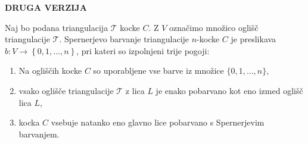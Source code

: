 \documentclass[mat1]{fmfdelo}
\newcommand{\0}{0}
\newcommand{\pT}{\mathcal T}
\begin{document}
\newpage
\textbf{DRUGA VERZIJA}
\begin{definicija}\label{def:alo}
Naj bo podana triangulacija $\pT$ kocke $C$. Z $V$ označimo množico oglišč triangulacije $\pT$. Spernerjevo barvanje triangulacije $n$-kocke $C$ je preslikava $b : V \to \left \{ 0, 1, \dots, n \right \}$, pri kateri so izpolnjeni trije pogoji:
\begin{enumerate}
\item Na ogliščih kocke $C$ so uporabljene vse barve iz množice $\{0, 1, \dots, n \}$, \label{spernerena}
\item vsako oglišče triangulacije $\pT$ z lica $L$ je enako pobarvano kot eno izmed oglišč lica $L$,\label{spernerdva}
\item kocka $C$ vsebuje natanko eno glavno lice pobarvano s Spernerjevim barvanjem.\label{spernertri}
\end{enumerate}
\end{definicija}
\end{document}
